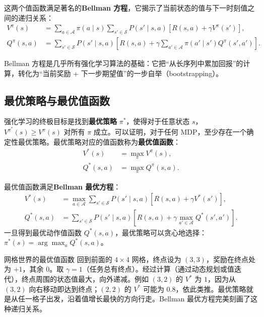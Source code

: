 这两个值函数满足著名的\textbf{Bellman 方程}，它揭示了当前状态的值与下一时刻值之间的递归关系：
\begin{align}
V^\pi(s) &= \sum_{a \in \mathcal{A}} \pi(a \mid s) \sum_{s' \in \mathcal{S}} P(s' \mid s, a) \left[ R(s,a) + \gamma V^\pi(s') \right], \label{eq:bellman_v} \\
Q^\pi(s,a) &= \sum_{s' \in \mathcal{S}} P(s' \mid s, a) \left[ R(s,a) + \gamma \sum_{a' \in \mathcal{A}} \pi(a' \mid s') Q^\pi(s',a') \right]. \label{eq:bellman_q}
\end{align}

Bellman 方程是几乎所有强化学习算法的基础：它把“从长序列中累加回报”的计算，转化为“当前奖励 + 下一步期望值”的一步自举（bootstrapping）。

\subsection{最优策略与最优值函数}

强化学习的终极目标是找到\textbf{最优策略} $\pi^*$，使得对于任意状态 $s$，$V^{\pi^*}(s) \ge V^\pi(s)$ 对所有 $\pi$ 成立。可以证明，对于任何 MDP，至少存在一个确定性最优策略。最优策略对应的值函数称为\textbf{最优值函数}：
\begin{align}
V^*(s) &= \max_\pi V^\pi(s), \label{eq:v_star} \\
Q^*(s,a) &= \max_\pi Q^\pi(s,a). \label{eq:q_star}
\end{align}

最优值函数满足\textbf{Bellman 最优方程}：
\begin{align}
V^*(s) &= \max_{a \in \mathcal{A}} \sum_{s' \in \mathcal{S}} P(s' \mid s, a) \left[ R(s,a) + \gamma V^*(s') \right], \label{eq:bellman_opt_v} \\
Q^*(s,a) &= \sum_{s' \in \mathcal{S}} P(s' \mid s, a) \left[ R(s,a) + \gamma \max_{a' \in \mathcal{A}} Q^*(s',a') \right]. \label{eq:bellman_opt_q}
\end{align}
一旦得到最优动作值函数 $Q^*(s,a)$，最优策略可以贪心地选择：$\pi^*(s) = \arg\max_a Q^*(s,a)$。

\begin{example}{网格世界的最优值函数}{}
    回到前面的 $4\times4$ 网格，终点设为 $(3,3)$，奖励在终点处为 $+1$，其余 $0$。取 $\gamma=1$（任务总有终点）。经过计算（通过动态规划或值迭代），终点周围的状态值最大，向外递减。例如 $(3,2)$ 的 $V^*$ 为 $1$，因为从 $(3,2)$ 向右移动即达到终点；$(2,2)$ 的 $V^*$ 可能为 $0.8$，依此类推。最优策略就是从任一格子出发，沿着值增长最快的方向行走。Bellman 最优方程完美刻画了这种递归关系。
\end{example}

